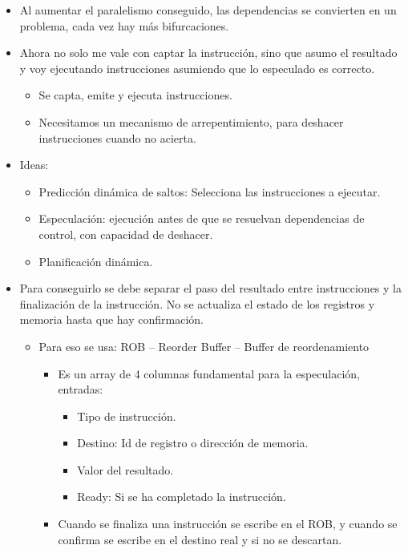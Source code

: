 \documentclass[12pt, twoside, openright]{report} %
\begin{document}
\begin{itemize}

	\item Al aumentar el paralelismo conseguido, las dependencias se
	      convierten en un problema, cada vez hay más bifurcaciones.
	\item Ahora no solo me vale con captar la instrucción, sino que asumo el
	      resultado y voy ejecutando instrucciones asumiendo que lo especulado
	      es correcto.

	      \begin{itemize}

		      \item Se capta, emite y ejecuta instrucciones.
		      \item Necesitamos un mecanismo de arrepentimiento, para deshacer
		            instrucciones cuando no acierta.
	      \end{itemize}
	\item Ideas:

	      \begin{itemize}

		      \item Predicción dinámica de saltos: Selecciona las instrucciones a
		            ejecutar.
		      \item Especulación: ejecución antes de que se resuelvan dependencias de
		            control, con capacidad de deshacer.
		      \item Planificación dinámica.
	      \end{itemize}
	\item Para conseguirlo se debe separar el paso del resultado entre
	      instrucciones y la finalización de la instrucción. No se actualiza
	      el estado de los registros y memoria hasta que hay confirmación.

	      \begin{itemize}

		      \item Para eso se usa: ROB -- Reorder Buffer -- Buffer de reordenamiento

		            \begin{itemize}

			            \item Es un array de 4 columnas fundamental para la especulación,
			                  entradas:

			                  \begin{itemize}

				                  \item Tipo de instrucción.
				                  \item Destino: Id de registro o dirección de memoria.
				                  \item Valor del resultado.
				                  \item Ready: Si se ha completado la instrucción.
			                  \end{itemize}
			            \item Cuando se finaliza una instrucción se escribe en el ROB, y cuando
			                  se confirma se escribe en el destino real y si no se descartan.


\end{itemize}
\end{itemize}
\end{itemize}
\end{document}

